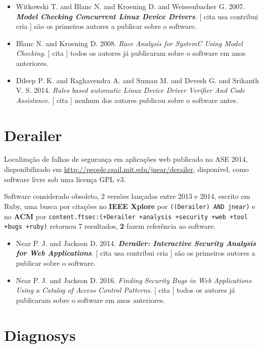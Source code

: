\begin{itemize}
\item Witkowski T. and Blanc N. and Kroening D. and Weissenbacher G.
      2007.
        \textbf{\textit{ Model Checking Concurrent Linux Device Drivers}}.
      [
          cita
          usa
          contribui
          cria
      ]
são os primeiros autores a publicar sobre o software.
\item Blanc N. and Kroening D.
      2008.
        \textit{ Race Analysis for SystemC Using Model Checking}.
      [
          cita
      ]
todos os autores já publicaram sobre o software em anos anteriores.
\item Dileep P. K. and Raghavendra A. and Suman M. and Devesh G. and Srikanth V. S.
      2014.
        \textit{ Rules based automatic Linux Device Driver Verifier And Code Assistance}.
      [
          cita
      ]
nenhum dos autores publicou sobre o software antes.
\end{itemize}
\section{Derailer}

Localização de falhas de segurança em aplicações web
publicado no ASE 2014,
disponibilizado em \url{http://people.csail.mit.edu/jnear/derailer},
disponível,
como software livre
sob uma licença GPL v3.

Software considerado obsoleto,
2 versões lançadas
entre 2013 e 2014,
escrito em Ruby,
uma busca por citações no {\bf IEEE Xplore} por
\texttt{((Derailer) AND jnear)}
e no {\bf ACM} por
\texttt{content.ftsec:(+Derailer +analysis +security +web +tool +bugs +ruby)}
retornou
7 resultados,
{\bf 2} fazem referência ao software.

\begin{itemize}
\item Near P. J. and Jackson D.
      2014.
        \textbf{\textit{ Derailer: Interactive Security Analysis for Web Applications}}.
      [
          cita
          usa
          contribui
          cria
      ]
são os primeiros autores a publicar sobre o software.
\item Near P. J. and Jackson D.
      2016.
        \textit{ Finding Security Bugs in Web Applications Using a Catalog of Access Control Patterns}.
      [
          cita
      ]
todos os autores já publicaram sobre o software em anos anteriores.
\end{itemize}
\section{Diagnosys}

